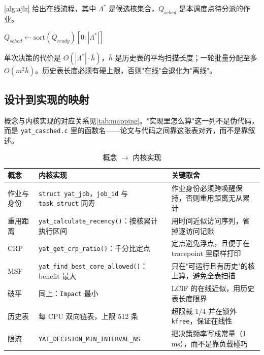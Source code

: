 \autoref{alg:ajlr} 给出在线流程，其中 $\Lambda^\ast$ 是候选核集合，$Q_{sched}$ 是本调度点待分派的作业。

\begin{algorithm}[H]
\caption{Yat-CASched 在线分配}
\label{alg:ajlr}
$Q_{sched}\leftarrow \mathrm{sort}(Q_{ready})[0:|\Lambda^\ast|]$\;
\end{algorithm}

单次决策的代价是 $O(|\Lambda^\ast|\cdot \bar h)$，$\bar h$ 是历史表的平均扫描长度；一轮批量分配至多 $O(m^2\bar h)$。历史表长度必须有硬上限，否则"在线"会退化为"离线"。

\subsection{设计到实现的映射}

概念与内核实现的对应关系见\autoref{tab:mapping}。"实现里怎么算"这一列不是伪代码，而是
\texttt{yat\_casched.c} 里的函数名——论文与代码之间靠这张表对齐，而不是靠叙述。

\begin{table}[H]
\centering
\caption{概念 $\to$ 内核实现}
\label{tab:mapping}
\small
\begin{tabular}{@{}p{2.6cm}p{4.6cm}p{6.4cm}@{}}
\toprule
概念 & 内核实现 & 关键取舍 \\
\midrule
作业与身份 & \texttt{struct yat\_job}，\texttt{job\_id} 与 \texttt{task\_struct} 同寿 & 作业身份必须跨唤醒保持，否则重用距离无从累计 \\
重用距离 & \texttt{yat\_calculate\_recency()}：按核累计执行区间 & 用时间近似访问序列，省掉逐访问记账 \\
CRP & \texttt{yat\_get\_crp\_ratio()}：千分比定点 & 定点避免浮点，且便于在 tracepoint 里原样打印 \\
MSF & \texttt{yat\_find\_best\_core\_allowed()}：benefit 最大 & 只在"可运行且有历史"的核上算，避免全表扫描 \\
破平 & 同上：\texttt{Impact} 最小 & LCIF 的在线近似，用历史表长度限界 \\
历史表 & 每 CPU 双向链表，上限 512 条 & 超限裁 1/4 并在锁外 \texttt{kfree}，保证在线性 \\
限流 & \texttt{YAT\_DECISION\_\allowbreak MIN\_INTERVAL\_NS} & 把决策频率写成常量（1\,ms），而不是靠负载碰巧 \\
\bottomrule
\end{tabular}
\end{table}

